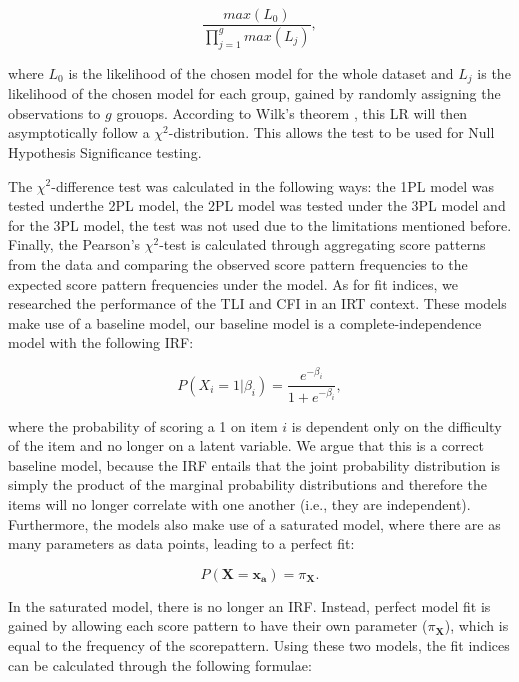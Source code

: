 \documentclass[Royal,sageapa,times,doublespace]{sagej}
\begin{document}
\begin{equation}
	\frac{max(L_0)}{\prod_{j = 1}^g max(L_j)},
\end{equation}

where $L_0$ is the likelihood of the chosen model for the whole dataset and $L_j$ is the likelihood of the chosen model for each group, gained by randomly assigning the observations to $g$ grouops. According to Wilk's theorem \cite{wilkth}, this LR will then asymptotically follow a $\chi^2$-distribution. This allows the test to be used for Null Hypothesis Significance testing. 

The $\chi^2$-difference test was calculated in the following ways: the 1PL model was tested underthe 2PL model, the 2PL model was tested under the 3PL model and for the 3PL model, the test was not used due to the limitations mentioned before. Finally, the Pearson's $\chi^2$-test is calculated through aggregating score patterns from the data and comparing the observed score pattern frequencies to the expected score pattern frequencies under the model. As for fit indices, we researched the performance of the TLI and CFI in an IRT context. These models make use of a baseline model, our baseline model is a complete-independence model with the following IRF:

\begin{equation}
P(X_i = 1 | \beta_{i}) = \frac{e^{- \beta_{i}}}{1 + e^{- \beta_{i}}},
\end{equation}

where the probability of scoring a 1 on item $i$ is dependent only on the difficulty of the item and no longer on a latent variable. We argue that this is a correct baseline model, because the IRF entails that the joint probability distribution is simply the product of the marginal probability distributions and therefore the items will no longer correlate with one another (i.e., they are independent). Furthermore, the models also make use of a saturated model, where there are as many parameters as data points, leading to a perfect fit:

\begin{equation}
P(\boldsymbol{X} = \boldsymbol{x_a}) = \pi_{\boldsymbol{X}}.
\end{equation}

In the saturated model, there is no longer an IRF. Instead, perfect model fit is gained by allowing each score pattern to have their own parameter ($\pi_{\boldsymbol{X}}$), which is equal to the frequency of the scorepattern. Using these two models, the fit indices can be calculated through the following formulae:
\end{document}
